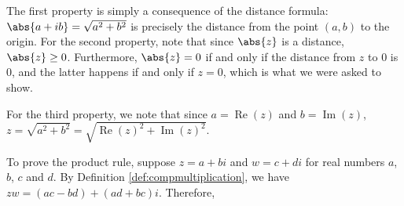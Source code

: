 \smallskip


\smallskip

The first property is simply a consequence of the distance formula: $\abs{a+ib} = \sqrt{a^2+b^2}$ is precisely the distance from the point $(a,b)$ to the origin.  For the second property, note that since $\abs{z}$ is a distance, $\abs{z} \geq 0$.  Furthermore,  $\abs{z} = 0$ if and only if the distance from $z$ to $0$ is $0$, and the latter happens if and only if $z = 0$, which is what we were asked to show. 

For the third property, we note that since $a = \operatorname{Re}(z)$ and $b = \operatorname{Im}(z)$, $z = \sqrt{a^2+b^2} = \sqrt{\operatorname{Re}(z)^2 + \operatorname{Im}(z)^2}$.


\smallskip

To prove the product rule, suppose $z = a + bi$ and  $w = c + di$ for real numbers $a$, $b$, $c$ and $d$.  By Definition \ref{def:compmultiplication}, we have $zw = (ac-bd) + (ad+bc)i$. Therefore,


